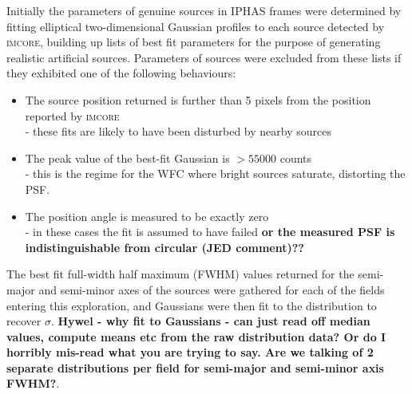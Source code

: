 \documentclass[a4paper,useAMS,usenatbib]{mn2e}
\begin{document}
Initially the parameters of genuine sources in IPHAS frames were determined by
fitting elliptical two-dimensional Gaussian profiles to each source detected by
\textsc{imcore}, building up lists of best fit parameters for the purpose of
generating realistic artificial sources.  Parameters of sources were excluded from 
these lists if they exhibited one of the following behaviours: 
\begin{itemize}\itemsep \item The source position returned is
further than 5 pixels from the position reported by \textsc{imcore} \\- these
fits are likely to have been disturbed by nearby sources \item The
peak value of the best-fit Gaussian is $>55000$ counts \\- this is the regime
for the WFC where bright sources saturate, distorting the PSF. \item The
position angle is measured to be exactly zero \\- in these cases the fit is
assumed to have failed {\bf or the measured PSF is indistinguishable from 
circular (JED comment)??}\end{itemize}

The best fit full-width half maximum (FWHM) values returned for the semi-major and 
semi-minor axes of the sources were gathered for each of the fields entering this 
exploration, and Gaussians were then fit to the distribution to recover $\sigma$. 
{\bf Hywel - why fit to Gaussians - can just read off median values, compute means 
etc from the raw distribution data?  Or do I horribly mis-read what you are trying 
to say.  Are we talking of 2 separate distributions per field for semi-major and 
semi-minor axis FWHM?}. 

\end{document}
